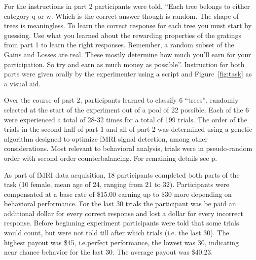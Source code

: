 \documentclass[doc,12pt]{apa}        %
\begin{document}
For the instructions in part 2 participants were told, ``Each tree belongs to either category q or w.  Which is the correct answer though is random.  The shape of trees is meaningless.  To learn the correct response for each tree you must start by guessing.  Use what you learned about the rewarding properties of the gratings from part 1 to learn the right responses.  Remember, a random subset of the Gains and Losses are real.  These mostly determine how much you'll earn for your participation.  So try and earn as much money as possible''.  Instruction for both parts were given orally by the experimenter using a script and Figure~\ref{fig:task} as a visual aid.

Over the course of part 2, participants learned to classify 6 ``trees'', randomly selected at the start of the experiment out of a pool of 22 possible.  Each of the 6 were experienced a total of 28-32 times for a total of 199 trials. The order of the trials in the second half of part 1 and all of part 2 was determined using a genetic algorithm designed to optimize fMRI signal detection, among other considerations.  Most relevant to behavioral analysis, trials were in pseudo-random order with second order counterbalancing.  For remaining details see p\pageref{sub:acquired}.

As part of fMRI data acquisition, 18 participants completed both parts of the task (10 female, mean age of 24, ranging from 21 to 32). Participants were compensated at a base rate of \$15.00 earning up to \$30 more depending on behavioral performance. For the last 30 trials the participant was be paid an additional dollar for every correct response and lost a dollar for every incorrect response.  Before beginning experiment participants were told that some trials would count, but were not told till after which trials (i.e. the last 30).  The highest payout was \$45, i.e.perfect performance, the lowest was 30, indicating near chance behavior for the last 30.  The average payout was \$40.23.
\end{document}
